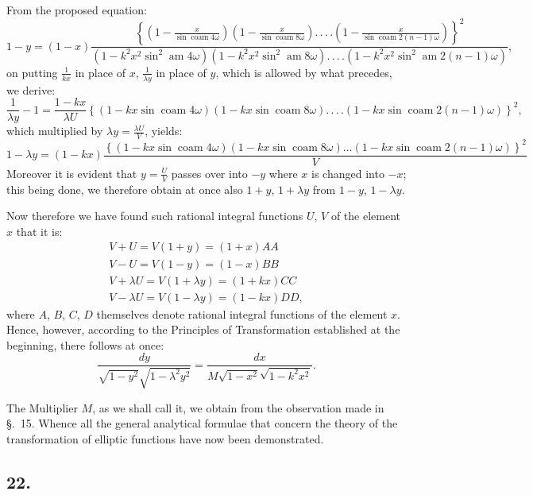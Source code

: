 \documentclass{article}
\begin{document}
From the proposed equation:
\[
1-y=(1-x)\frac{\left\{\left(1-\frac{x}{\sin\operatorname{coam}4\omega}\right)\left(1-\frac{x}{\sin\operatorname{coam}8\omega}\right).\,.\,.\,.\left(1-\frac{x}{\sin\operatorname{coam}2(n-1)\omega}\right)\right\}^{2}}{\left(1-k^{2}x^{2}\sin^{2}\operatorname{am}4\omega\right)\left(1-k^{2}x^{2}\sin^{2}\operatorname{am}8\omega\right).\,.\,.\,.\left(1-k^{2}x^{2}\sin^{2}\operatorname{am}2(n-1)\omega\right)},
\]
on putting $\frac{1}{kx}$ in place of $x$, $\frac{1}{\lambda y}$ in place of $y$, which is allowed by what precedes, we derive:
\[
\frac{1}{\lambda y}-1=\frac{1-kx}{\lambda U}\left\{\left(1-kx\sin\operatorname{coam}4\omega\right)\left(1-kx\sin\operatorname{coam}8\omega\right).\,.\,.\,.\left(1-kx\sin\operatorname{coam}2(n-1)\omega\right)\right\}^{2},
\]
which multiplied by $\lambda y=\frac{\lambda U}{V}$, yields:
\[
1-\lambda y=(1-kx)\frac{\left\{\left(1-kx\sin\operatorname{coam}4\omega\right)\left(1-kx\sin\operatorname{coam}8\omega\right)\ldots\left(1-kx\sin\operatorname{coam}2(n-1)\omega\right)\right\}^{2}}{V}
\]
Moreover it is evident that $y=\frac{U}{V}$ passes over into $-y$ where $x$ is changed into $-x$; this being done, we therefore obtain at once also $1+y$, $1+\lambda y$ from $1-y$, $1-\lambda y$.

Now therefore we have found such rational integral functions $U$, $V$ of the element $x$ that it is:
\[
\begin{gathered}
V+U=V(1+y)=(1+x)AA\\
V-U=V(1-y)=(1-x)BB\\
V+\lambda U=V(1+\lambda y)=(1+kx)CC\\
V-\lambda U=V(1-\lambda y)=(1-kx)DD,
\end{gathered}
\]
where $A$, $B$, $C$, $D$ themselves denote rational integral functions of the element $x$. Hence, however, according to the Principles of Transformation established at the beginning, there follows at once:
\[
\frac{dy}{\sqrt{1-y^{2}}\sqrt{1-\lambda^{2}y^{2}}}=\frac{dx}{M\sqrt{1-x^{2}}\sqrt{1-k^{2}x^{2}}}.
\]

The Multiplier $M$, as we shall call it, we obtain from the observation made in §.\ 15. Whence all the general analytical formulae that concern the theory of the transformation of elliptic functions have now been demonstrated.

\subsection*{22.}
\end{document}
